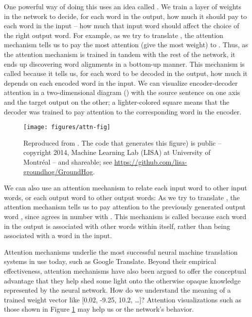 One powerful way of doing this uses an idea called  \citep{Vaswani-etal:2017}. We train a layer of weights in the network to decide, for each word in the output, how much  it should pay to each word in the input -- how much that input word should affect the choice of the right output word.  For example, as we try to translate , the attention mechanism tells us to pay the most attention (give the most weight) to .  Thus, as the attention mechanism is trained in tandem with the rest of the network,  it ends up discovering word alignments in a bottom-up manner.   This mechanism is called  because it tells us, for each word to be decoded in the output, how much it depends on each encoded word in the input.     We can visualize encoder-decoder attention in a two-dimensional diagram () with the source sentence on one axis and the target output on the other; a lighter-colored square means that the decoder was trained to pay attention to the corresponding word in the encoder. 

\begin{figure}
\texttt{[image: figures/attn-fig]}
\caption{Reproduced from \citet{Bahdanau-etal:2015}. \small{The code that generates this figure) is public -- copyright  2014, Machine Learning Lab (LISA) at University of Montr\'eal -- and shareable; see \url{https://github.com/lisa-groundhog/GroundHog}.}}
\label{attn-fig}
\end{figure}


We can also use an attention mechanism to relate each input word to other input words, or each output word to other output words: As we try to translate , the attention mechanism tells us to pay attention to the previously generated output word , since  agrees in number with .  This mechanism is called  because each word in the output is associated with other words within itself, rather than being associated with a word in the input.

Attention mechanisms underlie the most successful neural machine translation systems in use today, such as Google Translate.  Beyond their empirical effectiveness, attention mechanisms have also been argued to offer the conceptual advantage that they help shed some light onto the otherwise opaque knowledge represented by the neural network.    How do we understand the meaning of a trained weight vector like [0.02, -9.25, 10.2, \ldots]?  Attention visualizations such as those shown in Figure \ref{attn-fig} may help us   or  the network's behavior.

